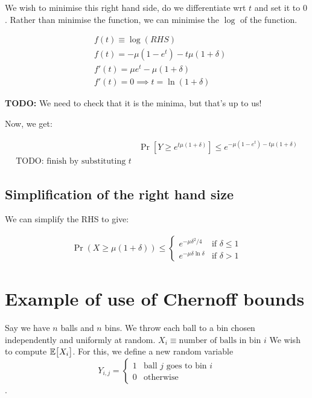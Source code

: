 We wish to minimise this right hand side, do we differentiate wrt $t$ and set
it to $0$.  Rather than minimise the function, we can minimise the $\log$ of
the function.

\begin{align*}
&f(t) \equiv \log (RHS) \\
&f(t) = -\mu(1 - e^t) - t\mu (1 + \delta) \\
& f'(t) = \mu e^t - \mu(1 + \delta) \\
& f'(t) = 0 \implies t = \ln (1 + \delta)
\end{align*}

\textbf{TODO:} We need to check that it is the minima, but that's up to us!

Now, we get:

\begin{align*}
&\Pr[Y \geq e^{t \mu (1 + \delta)}] \leq e^{-\mu (1 - e^t) - t\mu(1 + \delta)} \\
\text{TODO: finish by substituting $t$}
\end{align*}

\subsection{Simplification of the right hand size}

We can simplify the RHS to give:

\begin{align*}
\Pr(X \geq \mu(1 + \delta)) \leq
\begin{cases}
e^{-\mu \delta^2 / 4} & \text{if~$\delta \leq 1$} \\
e^{-\mu \delta \ln \delta} & \text{if~$\delta > 1$}
\end{cases}
\end{align*}

\section{Example of use of Chernoff bounds}

Say we have $n$ balls and $n$ bins. We throw each ball to a bin chosen
independently and uniformly at random. $X_i \equiv \text{number of balls in bin $i$}$
We wish to compute $\mathbb{E}\big[ X_i \big]$. For this, we define a new random variable
$$
Y_{i, j} =
\begin{cases}
1 & \text{ball $j$ goes to bin $i$} \\
0 & \text{otherwise}
\end{cases}
$$.

